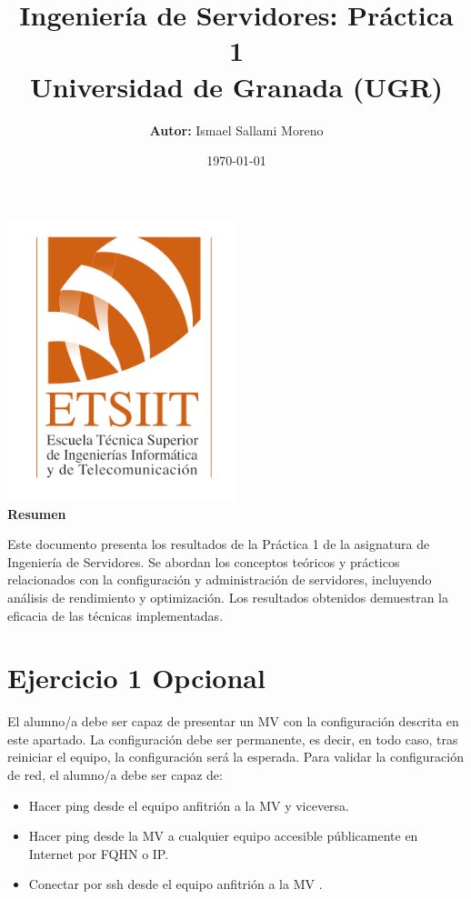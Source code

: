 \documentclass[a4paper,12pt]{article}
\title{
    \vspace{-2cm}
    \LARGE \textbf{Ingeniería de Servidores: Práctica 1} \\
    \large \textbf{Universidad de Granada (UGR)} \\
    \vspace{1cm}
}
\author{\textbf{Autor:} Ismael Sallami Moreno}
\date{\today}
\begin{document}
\maketitle
\thispagestyle{empty}

\vspace{2cm}
\begin{center}
    \includegraphics[width=0.5\textwidth]{images/etsiit.png} \\ %
    \vspace{1cm}
    \textbf{Resumen} \\
    \vspace{0.5cm}
    \parbox{0.8\textwidth}{
        Este documento presenta los resultados de la Práctica 1 de la asignatura de Ingeniería de Servidores. Se abordan los conceptos teóricos y prácticos relacionados con la configuración y administración de servidores, incluyendo análisis de rendimiento y optimización. Los resultados obtenidos demuestran la eficacia de las técnicas implementadas.
    }
\end{center}

\newpage

\tableofcontents
\newpage


\section{Ejercicio 1 Opcional}
El alumno/a debe ser capaz de presentar un MV con la configuración descrita en este apartado. La configuración debe ser permanente, es decir, en todo caso, tras reiniciar el equipo, la configuración será la esperada.
Para validar la configuración de red, el alumno/a debe ser capaz de:
\begin{itemize}
    \item Hacer ping desde el equipo anfitrión a la MV y viceversa.
    \item Hacer ping desde la MV a cualquier equipo accesible públicamente en Internet por FQHN o IP.
    \item Conectar por ssh desde el equipo anfitrión a la MV .
\end{itemize}
\end{document}

